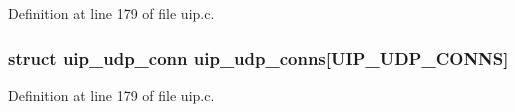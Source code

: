 Definition at line 179 of file uip.c.

\hypertarget{group__uip_gaeb533744817cf6695d75293369c2248b}{
\subsubsection[{uip\_\-udp\_\-conns}]{\setlength{\rightskip}{0pt plus 5cm}struct {\bf uip\_\-udp\_\-conn} {\bf uip\_\-udp\_\-conns}\mbox{[}UIP\_\-UDP\_\-CONNS\mbox{]}}}
\label{group__uip_gaeb533744817cf6695d75293369c2248b}


Definition at line 179 of file uip.c.


